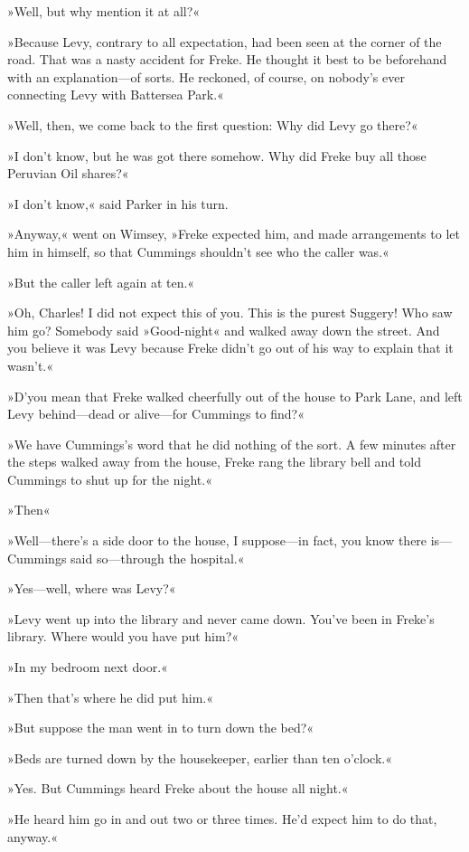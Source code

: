 »Well, but why mention it at all?«

»Because Levy, contrary to all expectation, had been seen at the corner of the road. That was a nasty accident for Freke. He thought it best to be beforehand with an explanation—of sorts. He reckoned, of course, on nobody's ever connecting Levy with Battersea Park.«

»Well, then, we come back to the first question: Why did Levy go there?«

»I don't know, but he was got there somehow. Why did Freke buy all those Peruvian Oil shares?«

»I don't know,« said Parker in his turn.

»Anyway,« went on Wimsey, »Freke expected him, and made arrangements to let him in himself, so that Cummings shouldn't see who the caller was.«

»But the caller left again at ten.«

»Oh, Charles! I did not expect this of you. This is the purest Suggery! Who saw him go? Somebody said »Good-night« and walked away down the street. And you believe it was Levy because Freke didn't go out of his way to explain that it wasn't.«

»D'you mean that Freke walked cheerfully out of the house to Park Lane, and left Levy behind—dead or alive—for Cummings to find?«

»We have Cummings's word that he did nothing of the sort. A few minutes after the steps walked away from the house, Freke rang the library bell and told Cummings to shut up for the night.«

»Then\longdash«

»Well—there's a side door to the house, I suppose—in fact, you know there is—Cummings said so—through the hospital.«

»Yes—well, where was Levy?«

»Levy went up into the library and never came down. You've been in Freke's library. Where would you have put him?«

»In my bedroom next door.«

»Then that's where he did put him.«

»But suppose the man went in to turn down the bed?«

»Beds are turned down by the housekeeper, earlier than ten o'clock.«

»Yes\textellipsis . But Cummings heard Freke about the house all night.«

»He heard him go in and out two or three times. He'd expect him to do that, anyway.«

